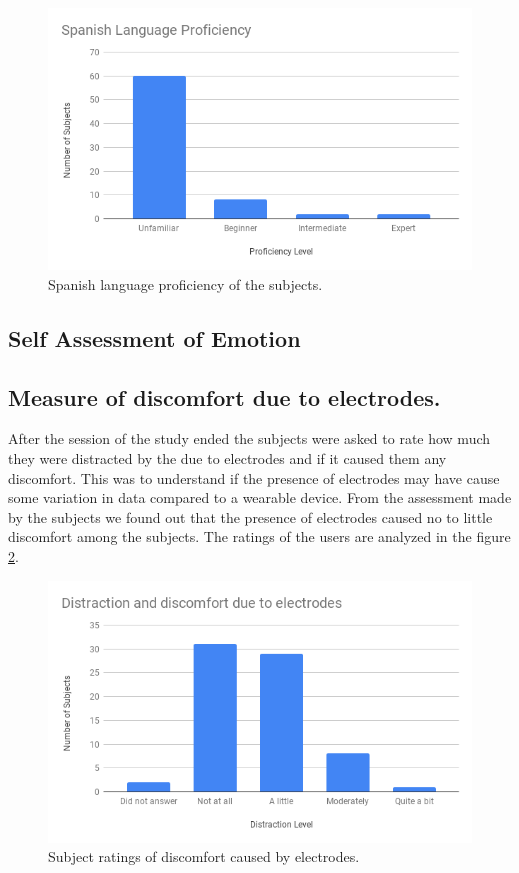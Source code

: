 \begin{figure}
    \centering
    \includegraphics[width=140mm]{Figures/spanish_language_proficiency.png}
    \caption{Spanish language proficiency of the subjects.}
    \label{fig:spanish_language}
\end{figure}

\subsection{Self Assessment of Emotion}

\subsection{Measure of discomfort due to electrodes.}
After the session of the study ended the subjects were asked to rate how much they were distracted by the due to electrodes and if it caused them any discomfort. This was to understand if the presence of electrodes may have cause some variation in data compared to a wearable device. From the assessment made by the subjects we found out that the presence of electrodes caused no to little discomfort among the subjects. The ratings of the users are analyzed in the figure \ref{fig:discomfort}.

\begin{figure}
    \centering
    \includegraphics[width=140mm]{Figures/distraction_and_discomfort.png}
    \caption{Subject ratings of discomfort caused by electrodes.}
    \label{fig:discomfort}
\end{figure}

